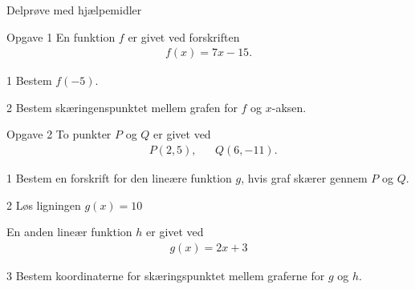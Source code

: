 \begin{center}
\LARGE
Delprøve med hjælpemidler 
\end{center}
\begin{opgavetekst}{Opgave 1}
	En funktion $f$ er givet ved forskriften
	\begin{align*}
		f(x) = 7x-15.
	\end{align*}
\end{opgavetekst}
\begin{delopgave}{}{1}
	Bestem $f(-5)$.
\end{delopgave}
\begin{delopgave}{}{2}
	Bestem skæringenspunktet mellem grafen for $f$ og $x$-aksen. 
\end{delopgave}
\begin{opgavetekst}{Opgave 2}
	To punkter $P$ og $Q$ er givet ved
	\begin{align*}
		&P(2,5), &&Q(6,-11).
	\end{align*}
\end{opgavetekst}
\begin{delopgave}{}{1}
	Bestem en forskrift for den lineære funktion $g$, hvis graf skærer gennem $P$ og $Q$. 
\end{delopgave}
\begin{delopgave}{}{2}
	Løs ligningen $g(x) = 10$
\end{delopgave}
\begin{meretekst}
	En anden lineær funktion $h$ er givet ved
	\begin{align*}
		g(x) = 2x+3
	\end{align*}
\end{meretekst}
\begin{delopgave}{}{3}
	Bestem koordinaterne for skæringspunktet mellem graferne for $g$ og $h$. 
\end{delopgave}
